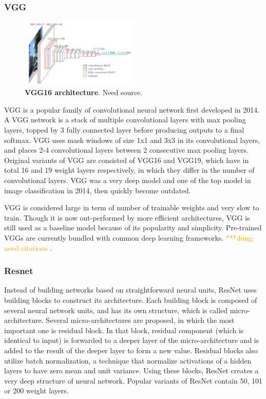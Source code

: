 \documentclass[conference]{IEEEtran}
\newcommand{\dungnote}[1]{ {\textcolor{orange} { ***dung: #1 }}}
\newcommand{\dungnote}[1]{}
\begin{document}
\subsubsection{VGG}

\begin{figure}[htpb]
	  \centering
	  \includegraphics[width=0.5\textwidth]{vgg16}
	  \caption{\textbf{VGG16 architecture}. Need source.}
	  \label{fig:vgg16}
\end{figure}
VGG is a popular family of convolutional neural network first developed in 2014. A VGG network is a stack of multiple convolutional layers with max pooling layers, topped by 3 fully connected layer before producing outputs to a final softmax. VGG uses mask windows of size 1x1 and 3x3 in its convolutional layers, and places 2-4 convolutional layers between 2 consecutive max pooling layers. Original variants of VGG are consisted of VGG16 and VGG19, which have in total 16 and 19 weight layers respectively, in which they differ in the number of convolutional layers. VGG was a very deep model and one of the top model in image classification in 2014, then quickly become outdated.

VGG is considered large in term of number of trainable weights and very slow to train. Though it is now out-performed by more efficient architectures, VGG is still used as a baseline model because of its popularity and simplicity. Pre-trained VGGs are currently bundled with common deep learning frameworks. \dungnote{need citations}.

\subsubsection{Resnet}
Instead of building networks based on straightforward neural units, ResNet uses building blocks to construct its architecture. Each building block is composed of several neural network units, and has its own structure, which is called micro-architecture. Several micro-architectures are proposed, in which the most important one is residual block. In that block, residual component (which is identical to input) is forwarded to a deeper layer of the micro-architecture and is added to the result of the deeper layer to form a new value. Residual blocks also utilize batch normalization, a technique that normalize activations of a hidden layers to have zero mean and unit variance. Using these blocks, ResNet creates a very deep structure of neural network. Popular variants of ResNet contain 50, 101 or 200 weight layers.
\end{document}
